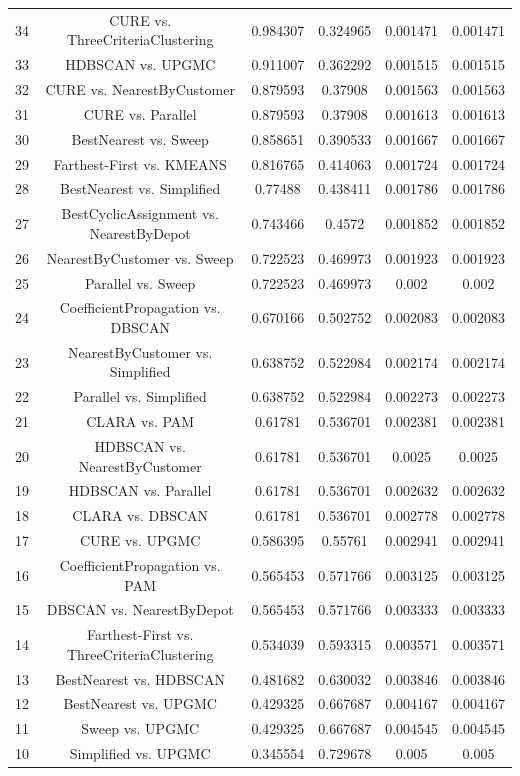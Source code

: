 \documentclass[a4paper,10pt]{article}
\begin{document}
\begin{landscape}
\begin{table}[!htp]
\begin{tabular}{cccccc}
34&CURE vs. ThreeCriteriaClustering&0.984307&0.324965&0.001471&0.001471\\
33&HDBSCAN vs. UPGMC&0.911007&0.362292&0.001515&0.001515\\
32&CURE vs. NearestByCustomer&0.879593&0.37908&0.001563&0.001563\\
31&CURE vs. Parallel&0.879593&0.37908&0.001613&0.001613\\
30&BestNearest vs. Sweep&0.858651&0.390533&0.001667&0.001667\\
29&Farthest-First vs. KMEANS&0.816765&0.414063&0.001724&0.001724\\
28&BestNearest vs. Simplified&0.77488&0.438411&0.001786&0.001786\\
27&BestCyclicAssignment vs. NearestByDepot&0.743466&0.4572&0.001852&0.001852\\
26&NearestByCustomer vs. Sweep&0.722523&0.469973&0.001923&0.001923\\
25&Parallel vs. Sweep&0.722523&0.469973&0.002&0.002\\
24&CoefficientPropagation vs. DBSCAN&0.670166&0.502752&0.002083&0.002083\\
23&NearestByCustomer vs. Simplified&0.638752&0.522984&0.002174&0.002174\\
22&Parallel vs. Simplified&0.638752&0.522984&0.002273&0.002273\\
21&CLARA vs. PAM&0.61781&0.536701&0.002381&0.002381\\
20&HDBSCAN vs. NearestByCustomer&0.61781&0.536701&0.0025&0.0025\\
19&HDBSCAN vs. Parallel&0.61781&0.536701&0.002632&0.002632\\
18&CLARA vs. DBSCAN&0.61781&0.536701&0.002778&0.002778\\
17&CURE vs. UPGMC&0.586395&0.55761&0.002941&0.002941\\
16&CoefficientPropagation vs. PAM&0.565453&0.571766&0.003125&0.003125\\
15&DBSCAN vs. NearestByDepot&0.565453&0.571766&0.003333&0.003333\\
14&Farthest-First vs. ThreeCriteriaClustering&0.534039&0.593315&0.003571&0.003571\\
13&BestNearest vs. HDBSCAN&0.481682&0.630032&0.003846&0.003846\\
12&BestNearest vs. UPGMC&0.429325&0.667687&0.004167&0.004167\\
11&Sweep vs. UPGMC&0.429325&0.667687&0.004545&0.004545\\
10&Simplified vs. UPGMC&0.345554&0.729678&0.005&0.005\\

\end{tabular}
\end{table}
\end{landscape}
\end{document}
